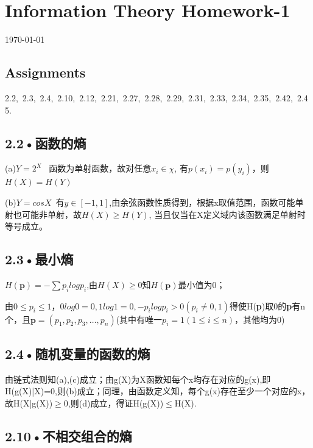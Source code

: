 \documentclass[UTF8]{ctexart}
\begin{document}
\section*{Information Theory Homework-1}
\begin{center}
\today
\end{center}
\subsection*{Assignments}

2.2,\ 2.3,\ 2.4,\ 2.10,\ 2.12,\ 2.21,\ 2.27,\ 2.28,\ 2.29,\ 2.31,\ 2.33,\ 2.34,\ 2.35,\ 2.42,\ 2.45.
\subsection*{2.2•函数的熵}

(a)$Y=2^X$ \ 函数为单射函数，故对任意$x_i \in \chi $, 有$p(x_i)=p(y_i)$，则$H(X)=H(Y)$


(b)$Y=cosX$\ 有$y\in [-1, 1]$,由余弦函数性质得到，根据x取值范围，函数可能单射也可能非单射，故$H(X)\geqslant H(Y)$, 当且仅当在X定义域内该函数满足单射时等号成立。


\subsection*{2.3•最小熵}

$H(\textbf{p})=-\sum p_ilogp_i$,由$H(X)\geqslant 0$知$H(\textbf{p})$最小值为0；

由$0\leqslant p_i \leqslant 1$，$0log0 = 0, 1log1=0, -p_ilogp_i > 0 (p_i \neq 0,1)$得使H(\textbf{p})取0的\textbf{p}有n个，且$\textbf{p}=(p_1, p_2, p_3, \dots ,p_n)$(其中有唯一$p_i=1(1\leqslant i \leqslant n)$，其他均为0)

\subsection*{2.4•随机变量的函数的熵}
由链式法则知(a),(c)成立；由g(X)为X函数知每个x均存在对应的g(x),即H(g(X)|X)=0,则(b)成立；同理，由函数定义知，每个g(x)存在至少一个对应的x，故H(X|g(X))$\geqslant$0,则(d)成立，得证H(g(X))$\leqslant$H(X).

\subsection*{2.10•不相交组合的熵}
\end{document}
